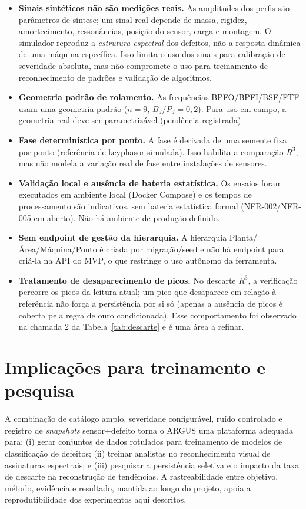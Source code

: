 \begin{itemize}
  \item \textbf{Sinais sintéticos não são medições reais.} As amplitudes dos
  perfis são parâmetros de síntese; um sinal real depende de massa, rigidez,
  amortecimento, ressonâncias, posição do sensor, carga e montagem. O simulador
  reproduz a \emph{estrutura espectral} dos defeitos, não a resposta dinâmica de
  uma máquina específica. Isso limita o uso dos sinais para calibração de
  severidade absoluta, mas não compromete o uso para treinamento de
  reconhecimento de padrões e validação de algoritmos.
  \item \textbf{Geometria padrão de rolamento.} As frequências BPFO/BPFI/BSF/FTF
  usam uma geometria padrão (\(n=9\), \(B_d/P_d = 0{,}2\)). Para uso em campo, a
  geometria real deve ser parametrizável (pendência registrada).
  \item \textbf{Fase determinística por ponto.} A fase é derivada de uma semente
  fixa por ponto (referência de keyphasor simulada). Isso habilita a comparação
  \(R^3\), mas não modela a variação real de fase entre instalações de sensores.
  \item \textbf{Validação local e ausência de bateria estatística.} Os ensaios
  foram executados em ambiente local (Docker Compose) e os tempos de
  processamento são indicativos, sem bateria estatística formal (NFR-002/NFR-005
  em aberto). Não há ambiente de produção definido.
  \item \textbf{Sem endpoint de gestão da hierarquia.} A hierarquia
  Planta/Área/Máquina/Ponto é criada por migração/seed e não há endpoint para
  criá-la na API do MVP, o que restringe o uso autônomo da ferramenta.
  \item \textbf{Tratamento de desaparecimento de picos.} No descarte \(R^3\), a
  verificação percorre os picos da leitura atual; um pico que desaparece em
  relação à referência não força a persistência por si só (apenas a ausência de
  picos é coberta pela regra de ouro condicionada). Esse comportamento foi
  observado na chamada 2 da Tabela~\ref{tab:descarte} e é uma área a refinar.
\end{itemize}

\section{Implicações para treinamento e pesquisa}

A combinação de catálogo amplo, severidade configurável, ruído controlado e
registro de \emph{snapshots} sensor+defeito torna o ARGUS uma plataforma
adequada para: (i) gerar conjuntos de dados rotulados para treinamento de
modelos de classificação de defeitos; (ii) treinar analistas no reconhecimento
visual de assinaturas espectrais; e (iii) pesquisar a persistência seletiva e o
impacto da taxa de descarte na reconstrução de tendências. A rastreabilidade
entre objetivo, método, evidência e resultado, mantida ao longo do projeto,
apoia a reprodutibilidade dos experimentos aqui descritos.

